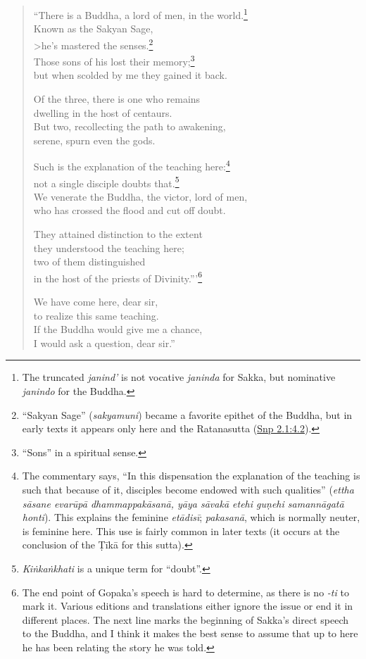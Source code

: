 \documentclass[12pt,openany]{book}%
\begin{document}
\begin{verse}
“There is a Buddha, a lord of men, in the world.\footnote{The truncated \textit{janind’} is not vocative \textit{janinda} for Sakka, but nominative \textit{janindo} for the Buddha. } \\
Known as the Sakyan Sage, \\>he’s mastered the senses.\footnote{“Sakyan Sage” (\textit{sakyamuni}) became a favorite epithet of the Buddha, but in early texts it appears only here and the Ratanasutta (\href{https://suttacentral.net/snp2.1/en/sujato\#4.2}{Snp 2.1:4.2}). } \\
Those sons of his lost their memory;\footnote{“Sons” in a spiritual sense. } \\
but when scolded by me they gained it back. 

Of the three, there is one who remains \\
dwelling in the host of centaurs. \\
But two, recollecting the path to awakening, \\
serene, spurn even the gods. 

Such is the explanation of the teaching here:\footnote{The commentary says, “In this dispensation the explanation of the teaching is such that because of it, disciples become endowed with such qualities” (\textit{ettha \textsanskrit{sāsane} \textsanskrit{evarūpā} \textsanskrit{dhammappakāsanā}, \textsanskrit{yāya} \textsanskrit{sāvakā} etehi \textsanskrit{guṇehi} \textsanskrit{samannāgatā} honti}). This explains the feminine \textit{\textsanskrit{etādisī}}; \textit{\textsanskrit{pakasanā}}, which is normally neuter, is feminine here. This use is fairly common in later texts (it occurs at the conclusion of the \textsanskrit{Ṭīkā} for this sutta). } \\
not a single disciple doubts that.\footnote{\textit{\textsanskrit{Kiṅkaṅkhati}} is a unique term for “doubt”. } \\
We venerate the Buddha, the victor, lord of men, \\
who has crossed the flood and cut off doubt. 

They attained distinction to the extent \\
they understood the teaching here; \\
two of them distinguished \\
in the host of the priests of Divinity.”’\footnote{The end point of Gopaka’s speech is hard to determine, as there is no \textit{-ti} to mark it. Various editions and translations either ignore the issue or end it in different places. The next line marks the beginning of Sakka’s direct speech to the Buddha, and I think it makes the best sense to assume that up to here he has been relating the story he was told. } 

We have come here, dear sir, \\
to realize this same teaching. \\
If the Buddha would give me a chance, \\
I would ask a question, dear sir.” 

%
\end{verse}
\end{document}
